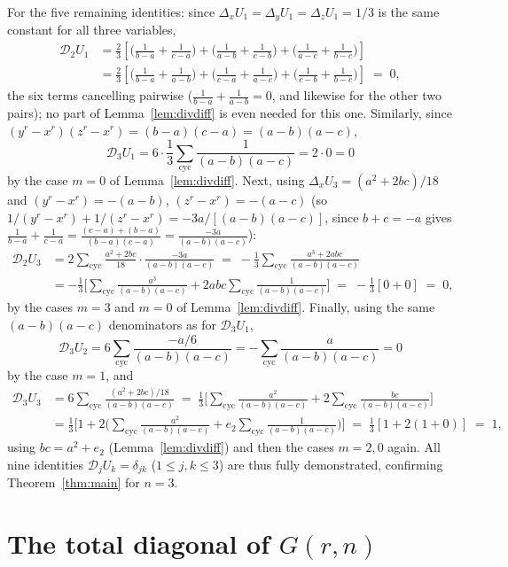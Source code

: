 \documentclass[11pt]{article}
\theoremstyle{remark}
\begin{document}
For the five remaining identities: since $\Delta_xU_1=\Delta_yU_1=\Delta_zU_1=1/3$ is the same constant for all three variables,
\begin{align*}
\mathcal D_2U_1 &= \frac23\left[\Big(\frac1{b-a}+\frac1{c-a}\Big)+\Big(\frac1{a-b}+\frac1{c-b}\Big)+\Big(\frac1{a-c}+\frac1{b-c}\Big)\right] \\
&= \frac23\left[\Big(\frac1{b-a}+\frac1{a-b}\Big)+\Big(\frac1{c-a}+\frac1{a-c}\Big)+\Big(\frac1{c-b}+\frac1{b-c}\Big)\right] \;=\; 0,
\end{align*}
the six terms cancelling pairwise ($\frac1{b-a}+\frac1{a-b}=0$, and likewise for the other two pairs); no part of Lemma~\ref{lem:divdiff} is even needed for this one. Similarly, since $(y^r-x^r)(z^r-x^r)=(b-a)(c-a)=(a-b)(a-c)$,
\[
\mathcal D_3U_1 = 6\cdot\frac13\sum_{\mathrm{cyc}}\frac1{(a-b)(a-c)} = 2\cdot0 = 0
\]
by the case $m=0$ of Lemma~\ref{lem:divdiff}. Next, using $\Delta_xU_3=(a^2+2bc)/18$ and $(y^r-x^r)=-( a-b)$, $(z^r-x^r)=-(a-c)$ (so $1/(y^r-x^r)+1/(z^r-x^r)=-3a/[(a-b)(a-c)]$, since $b+c=-a$ gives $\frac1{b-a}+\frac1{c-a}=\frac{(c-a)+(b-a)}{(b-a)(c-a)}=\frac{-3a}{(a-b)(a-c)}$):
\begin{align*}
\mathcal D_2U_3 &= 2\sum_{\mathrm{cyc}}\frac{a^2+2bc}{18}\cdot\frac{-3a}{(a-b)(a-c)} \;=\; -\frac13\sum_{\mathrm{cyc}}\frac{a^3+2abc}{(a-b)(a-c)} \\
&= -\frac13\Big[\sum_{\mathrm{cyc}}\frac{a^3}{(a-b)(a-c)} + 2abc\sum_{\mathrm{cyc}}\frac1{(a-b)(a-c)}\Big] \;=\; -\frac13[0+0]\;=\;0,
\end{align*}
by the cases $m=3$ and $m=0$ of Lemma~\ref{lem:divdiff}. Finally, using the same $(a-b)(a-c)$ denominators as for $\mathcal D_3U_1$,
\[
\mathcal D_3U_2 = 6\sum_{\mathrm{cyc}}\frac{-a/6}{(a-b)(a-c)} = -\sum_{\mathrm{cyc}}\frac{a}{(a-b)(a-c)} = 0
\]
by the case $m=1$, and
\begin{align*}
\mathcal D_3U_3 &= 6\sum_{\mathrm{cyc}}\frac{(a^2+2bc)/18}{(a-b)(a-c)} \;=\; \frac13\Big[\sum_{\mathrm{cyc}}\frac{a^2}{(a-b)(a-c)} + 2\sum_{\mathrm{cyc}}\frac{bc}{(a-b)(a-c)}\Big] \\
&= \frac13\Big[1 + 2\Big(\sum_{\mathrm{cyc}}\frac{a^2}{(a-b)(a-c)} + e_2\sum_{\mathrm{cyc}}\frac1{(a-b)(a-c)}\Big)\Big] \;=\; \frac13[1+2(1+0)]\;=\;1,
\end{align*}
using $bc=a^2+e_2$ (Lemma~\ref{lem:divdiff}) and then the cases $m=2,0$ again. All nine identities $\mathcal D_jU_k=\delta_{jk}$ ($1\le j,k\le3$) are thus fully demonstrated, confirming Theorem~\ref{thm:main} for $n=3$.

\section{The total diagonal of $G(r,n)$}\label{sec:diagonale}
\end{document}
